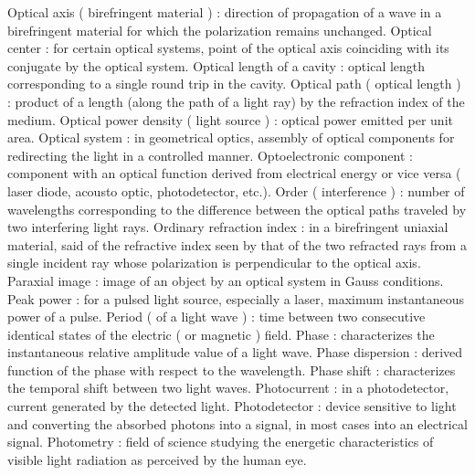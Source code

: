 Optical axis ( birefringent material )               : direction of propagation of a wave in a birefringent material for which the polarization remains unchanged.
Optical center                                       : for certain optical systems, point of the optical axis coinciding with its conjugate by the optical system.
Optical length of a cavity                           : optical length corresponding to a single round trip in the cavity.
Optical path ( optical length )                      : product of a length (along the path of a light ray) by the refraction index of the medium.
Optical power density ( light source )               : optical power emitted per unit area.
Optical system                                       : in geometrical optics, assembly of optical components for redirecting the light in a controlled manner.
Optoelectronic component                             : component with an optical function derived from electrical energy or vice versa ( laser diode, acousto optic, photodetector, etc.).
Order ( interference )                               : number of wavelengths corresponding to the difference between the optical paths traveled by two interfering light rays.
Ordinary refraction index                            : in a birefringent uniaxial material, said of the refractive index seen by that of the two refracted rays from a single incident ray whose polarization is perpendicular to the optical axis.
Paraxial image                                       : image of an object by an optical system in Gauss conditions.
Peak power                                           : for a pulsed light source, especially a laser, maximum instantaneous power of a pulse.
Period ( of a light wave )                           : time between two consecutive identical states of the electric ( or magnetic ) field.
Phase                                                : characterizes the instantaneous relative amplitude value of a light wave.
Phase dispersion                                     : derived function of the phase with respect to the wavelength.
Phase shift                                          : characterizes the temporal shift between two light waves.
Photocurrent                                         : in a photodetector, current generated by the detected light.
Photodetector                                        : device sensitive to light and converting the absorbed photons into a signal, in most cases into an electrical signal.
Photometry                                           : field of science studying the energetic characteristics of visible light radiation as perceived by the human eye.
